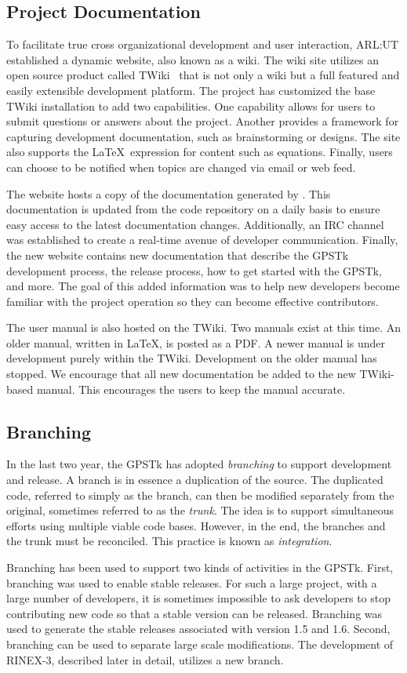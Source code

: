 \subsection*{Project Documentation} 

To facilitate true cross organizational development and user
interaction, ARL:UT established a dynamic website, also known as a
wiki. The wiki site utilizes an open source product called
TWiki~\cite{twiki} that is not only a wiki but a full featured and
easily extensible development platform. The project has customized the
base TWiki installation to add two capabilities. One capability allows
for users to submit questions or answers about the project. Another
provides a framework for capturing development documentation, such as
brainstorming or designs. The site also supports the
\LaTeX\ expression for content such as
equations. Finally, users can choose to be notified when topics are
changed via email or web feed.

The website hosts a copy of the documentation generated by .  This documentation  is updated from the code repository on a daily basis to ensure easy access to the latest documentation changes.  Additionally, an IRC channel was established to create a real-time avenue of developer communication.  Finally, the new website contains new documentation that describe the GPSTk development process, the release process, how to get started with the GPSTk, and more.  The goal of this added information was to help new developers become familiar with the project operation so they can become effective contributors.

The user manual is also hosted on the TWiki. Two manuals exist at this time.
An older manual, written in \LaTeX, is posted as a PDF. A newer manual is under
development purely within the TWiki. Development on the older manual has
stopped. We encourage that all new documentation be added to the new TWiki-based
manual. This encourages the users to keep the manual accurate.

\subsection*{Branching}

In the last two year, the GPSTk has adopted \emph{branching} to
support development and release. A branch is in essence a duplication
of the source.  The duplicated code, referred to simply as the branch,
can then be modified separately from the original, sometimes referred
to as the \emph{trunk}. The idea is to support simultaneous efforts
using multiple viable code bases. However, in the end, the branches and
the trunk must be reconciled. This practice is known as \emph{integration}.

Branching has been used to support two kinds
of activities in the GPSTk.  First, branching was used to enable stable releases. For such a large project, with a large number of
developers, it is sometimes impossible to ask developers to stop
contributing new code so that a stable version can be
released. Branching was used to generate the stable releases
associated with version 1.5 and 1.6. Second, branching can be used to
separate large scale modifications. The development of RINEX-3, described
later in detail, utilizes a new branch. 
